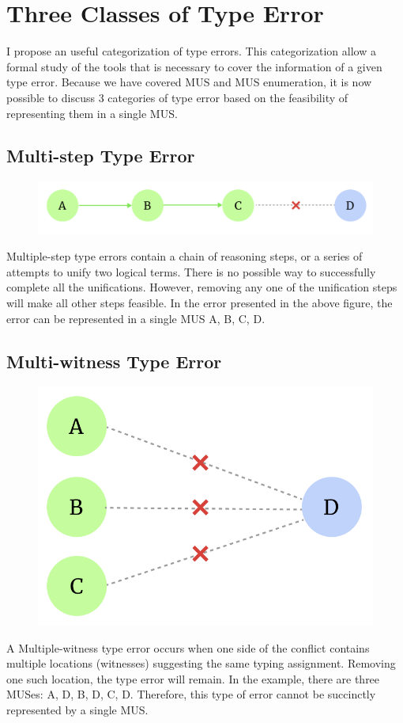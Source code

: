 \section{Three Classes of Type Error}

I propose an useful categorization of type errors. This categorization allow a formal study of the tools that is necessary to cover the information of a given type error.  Because we have covered MUS and MUS enumeration, it is now possible to discuss 3 categories of type error based on the feasibility of representing them in a single MUS.

\subsection{Multi-step Type Error}
\begin{figure}[hbt]
  \includegraphics[width=0.5\linewidth]{Multi-step}
  \caption{}
\end{figure}

Multiple-step type errors contain a chain of reasoning steps, or a series of attempts to unify two logical terms. There is no possible way to successfully complete all the unifications. However, removing any one of the unification steps will make all other steps feasible. In the error presented in the above figure, the error can be represented in a single MUS {A, B, C, D}.

\subsection{Multi-witness Type Error}
\begin{figure}[hbt]
  \includegraphics[width=0.5\linewidth]{Multi-witness}
  \caption{}
\end{figure}
A Multiple-witness type error occurs when one side of the conflict contains multiple locations (witnesses) suggesting the same typing assignment. Removing one such location, the type error will remain. In the example, there are three MUSes: {A, D}, {B, D}, {C, D}. Therefore, this type of error cannot be succinctly represented by a single MUS.

